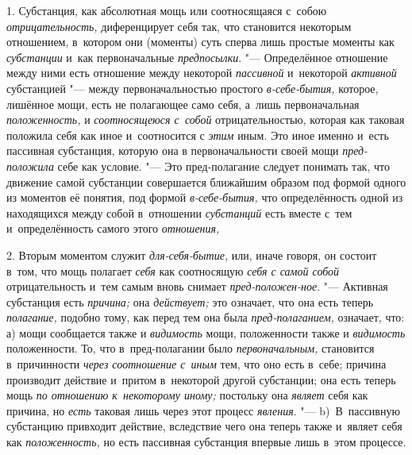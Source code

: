 1. Субстанция, как абсолютная мощь или соотносящаяся с~собою {\em отрицательность,}
диференцирует себя так, что становится некоторым отношением,
в~котором они (моменты) суть сперва лишь простые моменты как
{\em субстанции} и~как первоначальные {\em предпосылки}. "---
Определённое отношение между ними есть отношение между некоторой {\em пассивной}
и~некоторой {\em активной} субстанцией "--- между первоначальностью простого
{\em в-себе-бытия,} которое, лишённое мощи, есть не полагающее само себя,
а~лишь первоначальная {\em положенность,} и {\em соотносящеюся с~собой}
отрицательностью, которая как таковая положила себя как иное и~соотносится с
{\em этим} иным. Это иное именно и~есть пассивная субстанция, которую она в
первоначальности своей мощи {\em пред-положила} себе как условие. "--- Это
пред-полагание следует понимать так, что движение самой субстанции
совершается ближайшим образом под формой одного из моментов её понятия, под
формой {\em в-себе-бытия,} что определённость одной из находящихся между
собой в~отношении {\em субстанций} есть вместе с~тем и~определённость самого
этого {\em отношения,}

2. Вторым моментом служит {\em для-себя-бытие,} или, иначе говоря, он
состоит в~том, что мощь полагает {\em себя} как соотносящую {\em себя с
самой собой} отрицательность и~тем самым вновь снимает
{\em пред-положен-ное}. "--- Активная субстанция есть {\em причина;} она
{\em действует;} это означает, что она есть теперь {\em полагание,} подобно
тому, как перед тем она была {\em пред-полаганием,} означает, что: а) мощи
сообщается также и {\em видимость} мощи, положенности также и {\em видимость}
положенности. То, что в~пред-полагании было {\em первоначальным,} становится
в~причинности {\em через соотношение с~иным} тем, что оно есть в~себе;
причина производит действие и~притом в~некоторой другой субстанции; она есть
теперь мощь {\em по отношению к~некоторому иному;} постольку она {\em являет}
себя как причина, но {\em есть} таковая лишь через этот процесс {\em явления}.
"--- b)~В~пассивную субстанцию привходит действие, вследствие чего она теперь
также и~являет себя как {\em положенность,} но есть пассивная субстанция
впервые лишь в~этом процессе.

